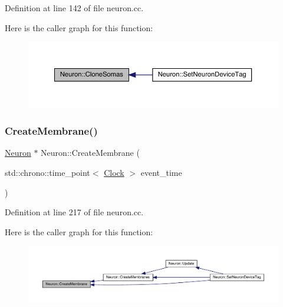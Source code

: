 Definition at line 142 of file neuron.\+cc.

Here is the caller graph for this function\+:
\nopagebreak
\begin{figure}[H]
\begin{center}
\leavevmode
\includegraphics[width=350pt]{class_neuron_a508841fa635a6e89609c514a79ea59da_icgraph}
\end{center}
\end{figure}
\mbox{\label{class_neuron_af06efbcc1a96af0290673e9e048267cf}} 
\subsubsection{\texorpdfstring{Create\+Membrane()}{CreateMembrane()}}
{\footnotesize\ttfamily \hyperlink{class_neuron}{Neuron} $\ast$ Neuron\+::\+Create\+Membrane (\begin{DoxyParamCaption}\item[{std\+::chrono\+::time\+\_\+point$<$ \hyperlink{universe_8h_a0ef8d951d1ca5ab3cfaf7ab4c7a6fd80}{Clock} $>$}]{event\+\_\+time }\end{DoxyParamCaption})}



Definition at line 217 of file neuron.\+cc.

Here is the caller graph for this function\+:
\nopagebreak
\begin{figure}[H]
\begin{center}
\leavevmode
\includegraphics[width=350pt]{class_neuron_af06efbcc1a96af0290673e9e048267cf_icgraph}
\end{center}
\end{figure}
\mbox{\label{class_neuron_a5f6f460c6a98319a05c3ba06d14e6f60}} 
